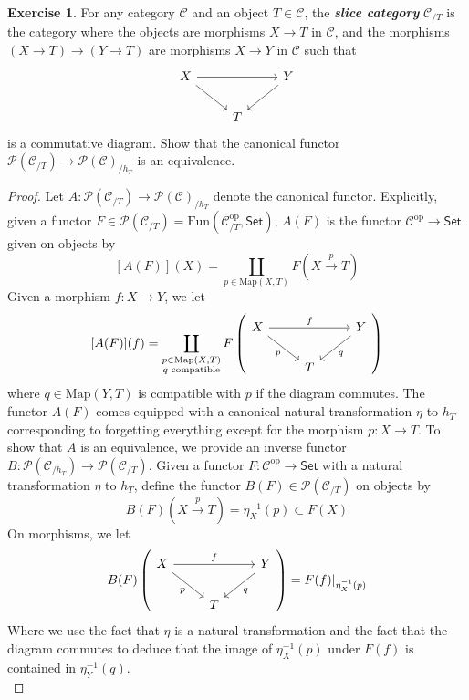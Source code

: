 \documentclass[psamsfonts, 12pt]{amsart}
\theoremstyle{definition}
\newtheorem{exer}[thm]{Exercise}
\theoremstyle{remark}
\newcommand{\ib}[1]{\textbf{\textit{#1}}}
\newcommand{\inv}{^{-1}}
\begin{document}
%
\setcounter{thm}{4}
%
\begin{exer}
For any category $\mathcal{C}$ and an object $T \in \mathcal{C}$, the \ib{slice category}
$\mathcal{C}_{/T}$ is the category where the objects are morphisms $X \to T$ in
$\mathcal{C}$, and the morphisms $(X\to T) \to (Y \to T)$ are morphisms $X \to Y$
in $\mathcal{C}$ such that
\[\begin{tikzcd}
X \ar[dr] \ar[rr]  & & Y \ar[dl] \\
& T
\end{tikzcd}\]
is a commutative diagram. Show that the canonical functor
$\mathcal{P}(\mathcal{C}_{/T}) \to \mathcal{P}(\mathcal{C})_{/h_T}$ is an equivalence.
\end{exer}
%
\begin{proof}
Let $A : \mathcal{P}(\mathcal{C}_{/T}) \to \mathcal{P}(\mathcal{C})_{/h_T}$ denote
the canonical functor. Explicitly, given a functor
$F \in \mathcal{P}(\mathcal{C}_{/T})
= \mathrm{Fun}(\mathcal{C}^{\mathrm{op}}_{/T},\mathsf{Set})$, $A(F)$ is the
functor $\mathcal{C}^{\mathrm{op}} \to \mathsf{Set}$ given on objects by
\[
[A(F)](X) = \coprod_{p \in \mathrm{Map}(X,T)} F\left(X \xrightarrow{p} T \right)
\]
Given a morphism $f : X \to Y$, we let
\[
[A(F)](f)  = \coprod_{\substack{p \in \mathrm{Map}(X,T) \\ q \text{ compatible}}}
F\left(\begin{tikzcd}
X \ar[rr, "f"] \ar[dr, "p"'] && Y \ar[dl, "q"] \\
& T
\end{tikzcd}\right)
\]
where $q \in \mathrm{Map}(Y,T)$ is compatible with $p$ if the diagram commutes.
The functor $A(F)$ comes equipped with a canonical natural transformation $\eta$ to
$h_T$ corresponding to forgetting everything except for the morphism $p : X \to T$.
To show that $A$ is an equivalence, we provide an inverse functor
$B : \mathcal{P}(\mathcal{C}_{/h_T}) \to \mathcal{P}(\mathcal{C}_{/T})$. Given a
functor $F : \mathcal{C}^{\mathrm{op}} \to \mathsf{Set}$ with a natural transformation
$\eta$ to $h_T$, define the functor $B(F) \in \mathcal{P}(\mathcal{C}_{/T})$ on
objects by
\[
B(F)(X \xrightarrow{p} T) = \eta_X\inv(p) \subset F(X)
\]
On morphisms, we let
\[
B(F)\left(\begin{tikzcd}
X \ar[rr,"f"] \ar[dr, "p"'] && Y \ar[dl, "q"]\\
& T
\end{tikzcd}\right) = F(f)\vert_{\eta_X\inv(p)}
\]
Where we use the fact that $\eta$ is a natural transformation and the
fact that the diagram commutes to deduce that the image of $\eta_X\inv(p)$ under $F(f)$
is contained in $\eta_Y\inv(q)$. \\


\end{proof}
\end{document}
